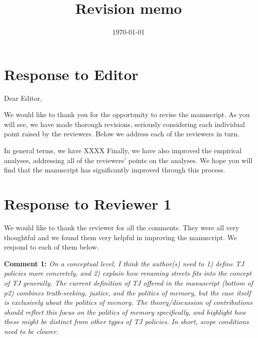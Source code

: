 \documentclass[12pt, a4paper, notitlepage]{article}
\title{\Large \textbf{Revision memo}\\\vspace{10pt}{\large `Do TJ policies cause backlash? Evidence from street name changes in Spain', submitted to Research \& Politics (Manuscript ID RAP-21-0006)}}
\author{}
\date{\large \today}
\begin{document}
\maketitle

\section*{Response to Editor}

Dear Editor,

We would like to thank you for the opportunity to revise the manuscript. As you will see, we have made thorough revisions, seriously considering each individual point raised by the reviewers. Below we address each of the reviewers in turn.

In general terms, we have  XXXX
Finally, we have also improved the empirical analyses, addressing all of the reviewers' points on the analyses. We hope you will find that the manuscript has significantly improved through this process.\\ [1ex]

\bigspace

\newpage

\section*{Response to Reviewer 1}

We would like to thank the reviewer for all the comments. They were all very thoughtful and we found them very helpful in improving the manuscript. We respond to each of them below.

\textbf{Comment 1:} \textit{On a conceptual level, I think the author(s) need to 1) define TJ policies more concretely, and 2) explain how renaming streets fits into the concept of TJ generally. The current definition of TJ offered in the manuscript (bottom of p2) combines truth-seeking, justice, and the politics of memory, but the case itself is exclusively about the politics of memory. The theory/discussion of contributions should reflect this focus on the politics of memory specifically, and highlight how these might be distinct from other types of TJ policies. In short, scope conditions need to be clearer.}
\end{document}
